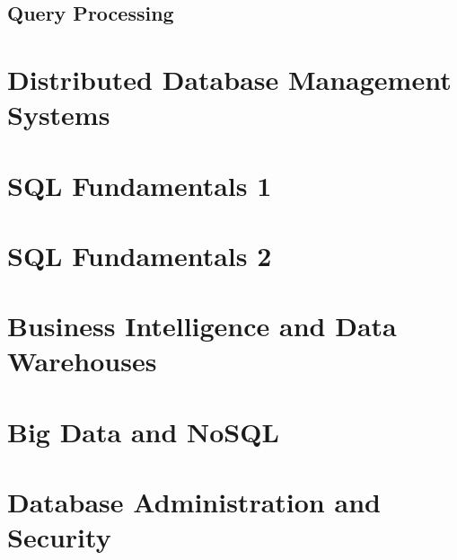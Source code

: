 \documentclass[a4paper, 11pt, titlepage]{report}
\begin{document}
\section{Query Processing}
\chapter{Distributed Database Management Systems}
\chapter{SQL Fundamentals 1}
\chapter{SQL Fundamentals 2}
\chapter{Business Intelligence and Data Warehouses}
\chapter{Big Data and NoSQL}
\chapter{Database Administration and Security}
\end{document}
